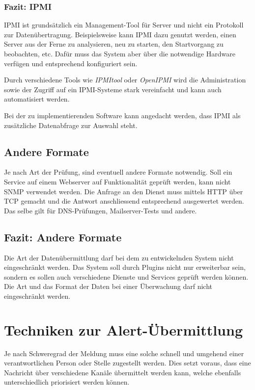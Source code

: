 \subsubsection{Fazit: IPMI} \label{sec:theorie-msg-ipmi-fazit}
IPMI ist grunds\"atzlich ein Management-Tool f\"ur Server und nicht ein Protokoll zur Daten\"ubertragung. Beispielsweise kann IPMI dazu genutzt werden, einen Server aus der Ferne zu analysieren, neu zu starten, den Startvorgang zu beobachten, etc. Daf\"ur muss das System aber \"uber die notwendige Hardware verf\"ugen und entsprechend konfiguriert sein.

Durch verschiedene Tools wie \textit{IPMItool}\cite{IPMItool} oder \textit{OpenIPMI}\cite{OpenIPMI} wird die Administration sowie der Zugriff auf ein IPMI-Systeme stark vereinfacht und kann auch automatisiert werden.

Bei der zu implementierenden Software kann angedacht werden, dass IPMI als zus\"atzliche Datenabfrage zur Auswahl steht.


\subsection{Andere Formate} \label{sec:theorie-msg-other}
Je nach Art der Pr\"ufung, sind eventuell andere Formate notwendig. Soll ein Service auf einem Webserver auf Funktionalit\"at gepr\"uft werden, kann nicht SNMP verwendet werden. Die Anfrage an den Dienst muss mittels HTTP \"uber TCP gemacht und die Antwort anschliessend entsprechend ausgewertet werden. Das selbe gilt f\"ur DNS-Pr\"ufungen, Mailserver-Tests und andere.

\subsection{Fazit: Andere Formate} \label{sec:theorie-msg-other-fazit}
Die Art der Daten\"ubermittlung darf bei dem zu entwickelnden System nicht eingeschr\"ankt werden. Das System soll durch Plugins nicht nur erweiterbar sein, sondern es sollen auch verschiedene Dienste und Services gepr\"uft werden k\"onnen. Die Art und das Format der Daten bei einer \"Uberwachung darf nicht eingeschr\"ankt werden.


\section{Techniken zur Alert-\"Ubermittlung} \label{sec:theorie-alertsend}
Je nach Schweregrad der Meldung muss eine solche schnell und umgehend einer verantwortlichen Person oder Stelle zugestellt werden. Dies setzt voraus, dass eine Nachricht \"uber verschiedene Kan\"ale \"ubermittelt werden kann, welche ebenfalls unterschiedlich priorisiert werden k\"onnen.

